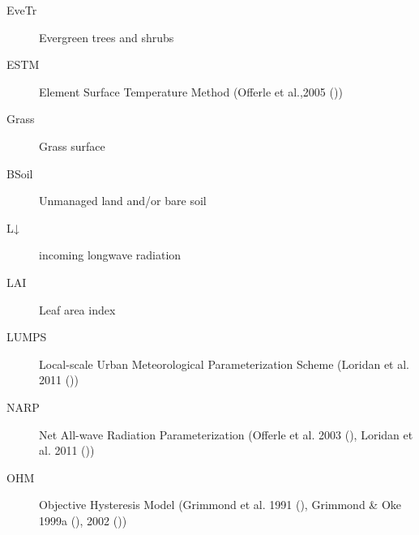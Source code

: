 \documentclass[letterpaper,10pt,english]{sphinxmanual}
\begin{document}
\begin{description}
\item[{EveTr}] \leavevmode{}\label{\detokenize{notation:term-evetr}}
Evergreen trees and shrubs

\item[{ESTM}] \leavevmode{}\label{\detokenize{notation:term-estm}}
Element Surface Temperature Method (Offerle et al.,2005 \label{\detokenize{notation:id1}}{\hyperref[\detokenize{references:oaf2005}]{\sphinxcrossref{{[}Oaf2005{]}}}} ())

\item[{Grass}] \leavevmode{}\label{\detokenize{notation:term-grass}}
Grass surface

\item[{BSoil}] \leavevmode{}\label{\detokenize{notation:term-bsoil}}
Unmanaged land and/or bare soil

\item[{L↓}] \leavevmode{}\label{\detokenize{notation:term-l}}
incoming longwave radiation

\item[{LAI}] \leavevmode{}\label{\detokenize{notation:term-lai}}
Leaf area index

\item[{LUMPS}] \leavevmode{}\label{\detokenize{notation:term-lumps}}
Local-scale Urban Meteorological Parameterization Scheme
(Loridan   et al. 2011 \label{\detokenize{notation:id2}}{\hyperref[\detokenize{references:l2011}]{\sphinxcrossref{{[}L2011{]}}}} ())

\item[{NARP}] \leavevmode{}\label{\detokenize{notation:term-narp}}
Net All-wave  Radiation   Parameterization (Offerle et al. 2003 \label{\detokenize{notation:id3}}{\hyperref[\detokenize{references:o2003}]{\sphinxcrossref{{[}O2003{]}}}} (), Loridan et al. 2011 \label{\detokenize{notation:id4}}{\hyperref[\detokenize{references:l2011}]{\sphinxcrossref{{[}L2011{]}}}} ())

\item[{OHM}] \leavevmode{}\label{\detokenize{notation:term-ohm}}
Objective Hysteresis Model (Grimmond et al. 1991 \label{\detokenize{notation:id5}}{\hyperref[\detokenize{references:g91ohm}]{\sphinxcrossref{{[}G91OHM{]}}}} (), Grimmond \& Oke 1999a \label{\detokenize{notation:id6}}{\hyperref[\detokenize{references:go99qs}]{\sphinxcrossref{{[}GO99QS{]}}}} (), 2002 \label{\detokenize{notation:id7}}{\hyperref[\detokenize{references:go2002}]{\sphinxcrossref{{[}GO2002{]}}}} ())


\end{description}
\end{document}
